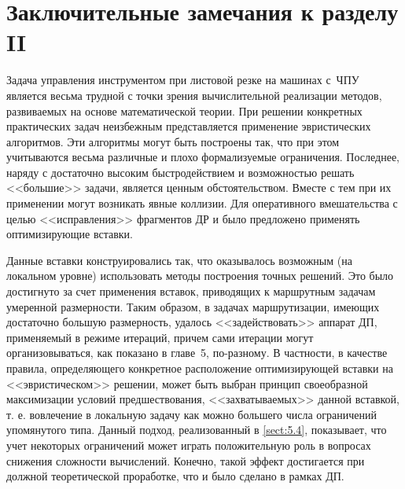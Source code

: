 
\clearpage
\section*{
  Заключительные замечания
  к разделу II
}

Задача управления инструментом при листовой резке на машинах с~ЧПУ
является весьма трудной с точки зрения вычислительной реализации методов,
развиваемых на основе математической теории.
При решении конкретных практических задач неизбежным
представляется применение эвристических алгоритмов.
Эти алгоритмы могут быть построены так,
что при этом учитываются весьма различные
и плохо формализуемые ограничения.
Последнее, наряду с достаточно высоким
быстродействием и возможностью решать <<большие>> задачи,
является ценным обстоятельством.
Вместе с тем при их применении могут возникать явные коллизии.
Для оперативного
вмешательства с целью <<исправления>> фрагментов ДР
и было предложено применять оптимизирующие вставки.

Данные вставки конструировались так,
что оказывалось возможным
(на локальном уровне)
использовать методы построения точных решений.
Это было достигнуто за счет применения вставок,
приводящих к маршрутным задачам умеренной размерности.
Таким образом, в задачах маршрутизации,
имеющих достаточно большую размерность,
удалось <<задействовать>> аппарат ДП, применяемый в режиме итераций,
причем сами итерации могут организовываться,
как показано в главе~5, по-разному.
В частности, в качестве правила,
определяющего конкретное расположение оптимизирующей вставки на
<<эвристическом>> решении,
может быть выбран принцип своеобразной максимизации условий предшествования,
<<захватываемых>> данной вставкой,
т. е. вовлечение в локальную задачу
как можно большего числа ограничений упомянутого типа.
Данный подход, реализованный
в \ref{sect:5.4},
показывает,
что учет некоторых ограничений может играть положительную роль
в вопросах снижения сложности вычислений.
Конечно, такой эффект достигается при должной
теоретической проработке,
что и было сделано в рамках ДП.
